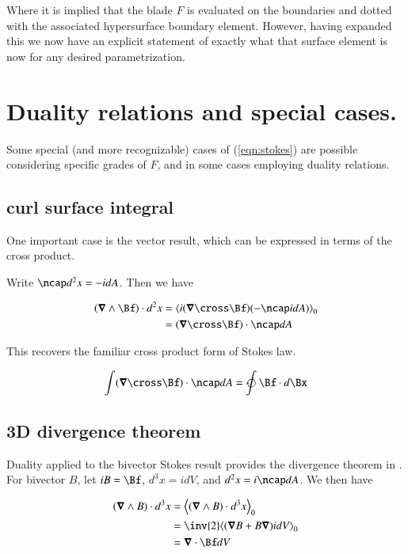 Where it is implied that the blade $F$ is evaluated on the boundaries and dotted with the associated hypersurface boundary element.  However, having expanded this we now have an explicit statement of exactly what that surface element is now for any desired parametrization.

\section{Duality relations and special cases.}

Some special (and more recognizable) cases of (\ref{eqn:stokes}) are possible considering specific grades of $F$, and in some cases employing duality relations.  

\subsection{curl surface integral}

One important case is the  vector result, which can be expressed in terms of the cross product.

Write $\ncap d^2 x = -i dA$.  Then we have

\begin{align*}
( \spacegrad \wedge \Bf ) \cdot d^2 x
&=
\gpgradezero{ i (\spacegrad \cross \Bf) (- \ncap i dA) } \\
&=
(\spacegrad \cross \Bf) \cdot \ncap dA
\end{align*}

This recovers the familiar cross product form of Stokes law.

\begin{align}
\int (\spacegrad \cross \Bf) \cdot \ncap dA = \ointclockwise \Bf \cdot d\Bx
\end{align}

\subsection{3D divergence theorem}

Duality applied to the bivector Stokes result provides the divergence theorem in .  For bivector $B$, let $iB = \Bf$, $d^3 x = i dV$, and $d^2 x = i \ncap dA$.  We then have

\begin{align*}
( \spacegrad \wedge B ) \cdot d^3 x
&=
\gpgradezero{ ( \spacegrad \wedge B ) \cdot d^3 x } \\
&=
\inv{2} \gpgradezero{ ( \spacegrad B + B \spacegrad ) i dV } \\
&=
\spacegrad \cdot \Bf dV \\
\end{align*}

